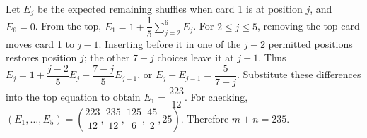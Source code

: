 Let $E_j$ be the expected remaining shuffles when card 1 is at position $j$, and $E_6=0$. From the top, $E_1=1+\dfrac{1}{5}\sum_{j=2}^6E_j$. For $2\le j\le5$, removing the top card moves card 1 to $j-1$. Inserting before it in one of the $j-2$ permitted positions restores position $j$; the other $7-j$ choices leave it at $j-1$. Thus $E_j=1+\dfrac{j-2}{5}E_j+\dfrac{7-j}{5}E_{j-1}$, or $E_j-E_{j-1}=\dfrac{5}{7-j}$. Substitute these differences into the top equation to obtain $E_1=\dfrac{223}{12}$. For checking, $(E_1,\ldots,E_5)=(\dfrac{223}{12},\dfrac{235}{12},\dfrac{125}{6},\dfrac{45}{2},25)$. Therefore $\boxed{m+n=235}$.
